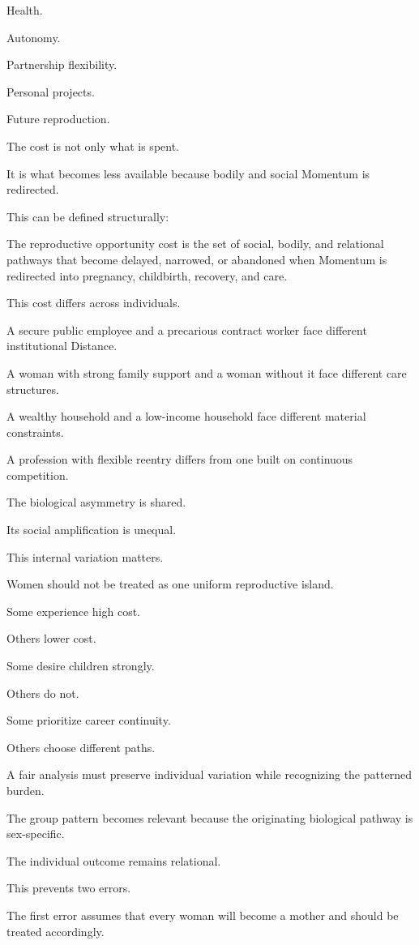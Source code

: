 Health.

Autonomy.

Partnership flexibility.

Personal projects.

Future reproduction.

The cost is not only what is spent.

It is what becomes less available because bodily and social Momentum is redirected.

This can be defined structurally:

The reproductive opportunity cost is the set of social, bodily, and relational pathways that become delayed, narrowed, or abandoned when Momentum is redirected into pregnancy, childbirth, recovery, and care.

This cost differs across individuals.

A secure public employee and a precarious contract worker face different institutional Distance.

A woman with strong family support and a woman without it face different care structures.

A wealthy household and a low-income household face different material constraints.

A profession with flexible reentry differs from one built on continuous competition.

The biological asymmetry is shared.

Its social amplification is unequal.

This internal variation matters.

Women should not be treated as one uniform reproductive island.

Some experience high cost.

Others lower cost.

Some desire children strongly.

Others do not.

Some prioritize career continuity.

Others choose different paths.

A fair analysis must preserve individual variation while recognizing the patterned burden.

The group pattern becomes relevant because the originating biological pathway is sex-specific.

The individual outcome remains relational.

This prevents two errors.

The first error assumes that every woman will become a mother and should be treated accordingly.

